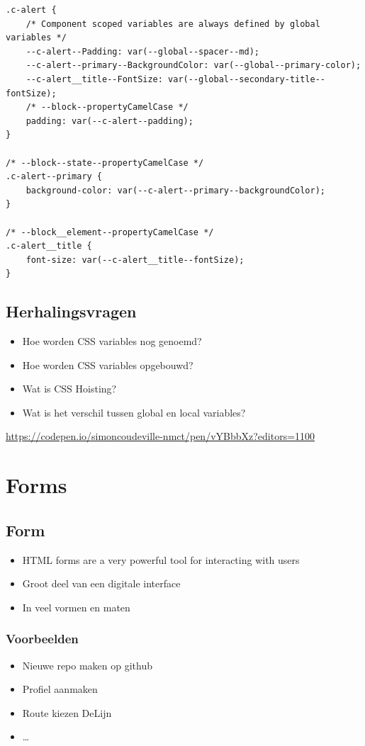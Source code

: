 \documentclass{article}
\begin{document}
\begin{verbatim}
.c-alert {
    /* Component scoped variables are always defined by global variables */
    --c-alert--Padding: var(--global--spacer--md);
    --c-alert--primary--BackgroundColor: var(--global--primary-color);
    --c-alert__title--FontSize: var(--global--secondary-title--fontSize);
    /* --block--propertyCamelCase */
    padding: var(--c-alert--padding);
}

/* --block--state--propertyCamelCase */
.c-alert--primary {
    background-color: var(--c-alert--primary--backgroundColor);
}

/* --block__element--propertyCamelCase */
.c-alert__title {
    font-size: var(--c-alert__title--fontSize);
}
\end{verbatim}

\subsection{Herhalingsvragen}

\begin{itemize}
    \item Hoe worden CSS variables nog genoemd?
    \item Hoe worden CSS variables opgebouwd?
    \item Wat is CSS Hoisting?
    \item Wat is het verschil tussen global en local variables?
\end{itemize}

\url{https://codepen.io/simoncoudeville-nmct/pen/vYBbbXz?editors=1100}

\section{Forms}

\subsection{Form}
\begin{itemize}
    \item HTML forms are a very powerful tool for interacting with users
    \item Groot deel van een digitale interface
    \item In veel vormen en maten
\end{itemize}

\subsubsection{Voorbeelden}
\begin{itemize}
    \item Nieuwe repo maken op github
    \item Profiel aanmaken
    \item Route kiezen DeLijn
    \item \dots
\end{itemize}
\end{document}
